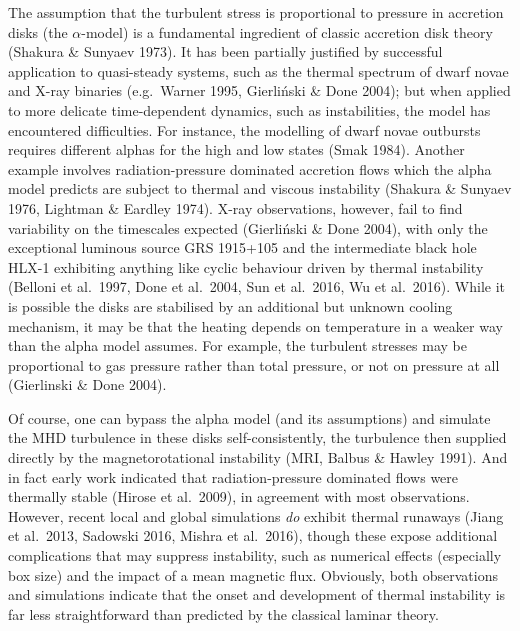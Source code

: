 \documentclass[useAMS]{mn2e}
\begin{document}
The assumption that the turbulent stress is proportional to
pressure in accretion disks (the $\alpha$-model) is a 
fundamental ingredient of classic
accretion disk theory (Shakura \& Sunyaev
1973). It has been partially justified by
successful application to quasi-steady systems, such as the thermal
spectrum of dwarf novae and X-ray binaries 
(e.g.\ Warner 1995, Gierli\'{n}ski \& Done 2004);
but when
applied to more delicate time-dependent dynamics,
such as instabilities, the model has encountered difficulties. 
For instance, the modelling of dwarf novae outbursts requires
different alphas for the high and low states (Smak 1984).
Another example involves
radiation-pressure dominated accretion flows which the alpha model predicts 
are subject to
thermal and viscous instability
(Shakura \&
Sunyaev 1976, Lightman \& Eardley 1974). X-ray observations, however, fail to find
variability on the timescales expected 
(Gierli\'{n}ski \& Done 2004), with only the exceptional luminous source
GRS 1915+105 and the intermediate black hole HLX-1 exhibiting
anything like cyclic behaviour driven by thermal instability (Belloni
et al.~1997, Done
et al.~2004, Sun et al.~2016, Wu et al.~2016). While it is possible
the disks are stabilised by an additional but unknown
 cooling mechanism, it may be that the heating
depends on temperature in a weaker way than the alpha model
assumes. For example, the turbulent stresses may be proportional to gas
pressure rather than total pressure, or not on pressure at all
(Gierlinski \& Done 2004). 

Of course, one can bypass the alpha model (and its assumptions) and 
simulate the MHD turbulence in these disks self-consistently, the
turbulence then supplied directly by the magnetorotational instability (MRI, Balbus
\& Hawley 1991). 
And in fact early work indicated that radiation-pressure dominated flows were
thermally stable (Hirose et al.~2009), in agreement with most
observations.
However, recent local and global simulations \emph{do} exhibit thermal runaways
(Jiang et al.~2013, Sadowski 2016, Mishra et al.~2016), 
though these expose additional complications that may
suppress instability, such as
numerical effects (especially box size) and the impact of a mean
magnetic flux. 
Obviously, both observations and simulations indicate that the onset and
development of thermal instability is far less straightforward than
predicted by the classical laminar theory. 
\end{document}
